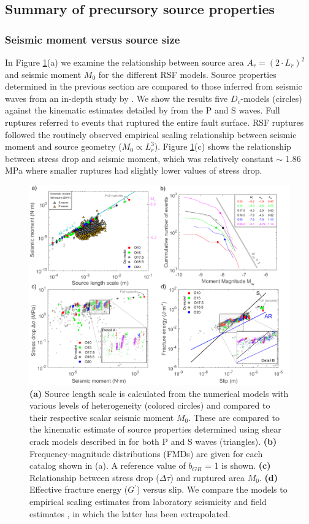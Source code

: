 \documentclass[preprint,1p, 10pt,authoryear]{elsarticle}
\begin{document}
\subsection{Summary of precursory source properties}
\subsubsection{Seismic moment versus source size}
In Figure \ref{fig10}(a) we examine the relationship between source area $A_{r} = (2\cdot L_{r})^{2}$ and seismic moment $M_{0}$ for the different RSF models. Source properties determined in the previous section are compared to those inferred from seismic waves from an in-depth study by \citet{Selvadurai2019}. We show the results five $D_{c}$-models (circles) against the kinematic estimates detailed by \citet{Selvadurai2019} from the P and S waves.  Full ruptures referred to events that ruptured the entire fault surface. RSF ruptures followed the routinely observed empirical scaling relationship between seismic moment and source geometry ($M_{0} \propto L_{r}^{3}$). Figure \ref{fig10}(c) shows the relationship between stress drop and seismic moment, which was relatively constant $\sim$ 1.86 MPa where smaller ruptures had slightly lower values of stress drop.

\begin{figure}
	\centering
	\includegraphics[scale = 0.95]{FIG10_revised.pdf} 
	\caption{\textbf{(a)} Source length scale is calculated from the numerical models with various levels of heterogeneity (colored circles) and compared to their respective scalar seismic moment $M_{0}$. These are compared to the kinematic estimate of source properties determined using shear crack models described in \citet{Selvadurai2019} for both P and S waves (triangles). \textbf{(b)} Frequency-magnitude distributions (FMDs) are given for each catalog shown in (a). A reference value of  $b_{GR}$ = 1 is shown. \textbf{(c)} Relationship between stress drop ($\Delta\tau$) and ruptured area $M_{0}$. \textbf{(d)} Effective fracture energy ($G^{'}$) versus slip. We compare the models to empirical scaling estimates from laboratory seismicity \citep[black line,][]{Selvadurai2019} and field estimates \citep[blue line][]{Abercrombie2005}, in which the latter has been extrapolated.}
	\label{fig10}
\end{figure}
\end{document}

